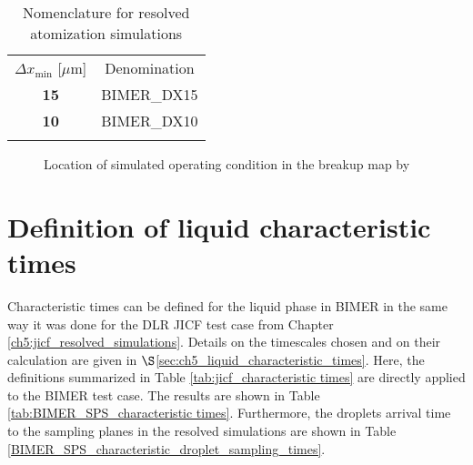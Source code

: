 \begin{table}[!h]
\centering
\caption{Nomenclature for resolved atomization simulations}
\begin{tabular}{cc}
\thickhline
$\Delta x_\mathrm{min}$ [$\mu$m]  &  Denomination \\ 
\thickhline
\textbf{15} & BIMER\_DX15 \\
\textbf{10} & BIMER\_DX10 \\
\thickhline
\end{tabular}
\label{tab:BIMER_resolved_simulations_performed}
\end{table}

\begin{figure}[ht]
     \centering
     \caption{Location of simulated operating condition in the breakup map by \citeColor[wu_breakup_1997]}
      \label{fig:location_BIMER_op_in_breakup_map}
\end{figure}


\clearpage

\section{Definition of liquid characteristic times}

Characteristic times can be defined for the liquid phase in BIMER in the same way it was done for the DLR JICF test case from Chapter \ref{ch5:jicf_resolved_simulations}. Details on the timescales chosen and on their calculation are given in $\S$\ref{sec:ch5_liquid_characteristic_times}. Here, the definitions summarized in Table \ref{tab:jicf_characteristic times} are directly applied to the BIMER test case. The results are shown in Table \ref{tab:BIMER_SPS_characteristic times}. Furthermore, the droplets arrival time to the sampling planes in the resolved simulations are shown in Table \ref{BIMER_SPS_characteristic_droplet_sampling_times}.

